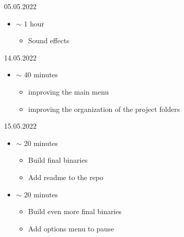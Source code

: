 \documentclass{article}
\begin{document}
05.05.2022
\begin{itemize}
	\item $\sim$ 1 hour
	\begin{itemize}
		\item Sound effects
	\end{itemize}
\end{itemize}

14.05.2022
\begin{itemize}
	\item $\sim$ 40 minutes
	\begin{itemize}
		\item improving the main menu
		\item improving the organization of the project folders
	\end{itemize}
\end{itemize}

15.05.2022
\begin{itemize}
	\item $\sim$ 20 minutes
	\begin{itemize}
		\item Build final binaries
		\item Add readme to the repo
	\end{itemize}
	\item $\sim$ 20 minutes
\begin{itemize}
	\item Build even more final binaries
	\item Add options menu to pause
\end{itemize}
\end{itemize}
\end{document}
